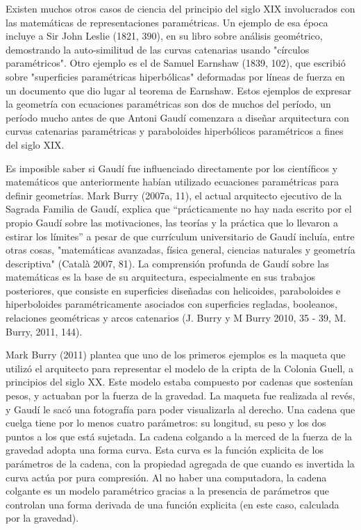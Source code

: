 Existen muchos otros casos de ciencia del principio del siglo XIX involucrados con las matemáticas de representaciones paramétricas. Un ejemplo de esa época incluye a Sir John Leslie (1821, 390), en su libro sobre análisis geométrico, demostrando la auto-similitud de las curvas catenarias usando "círculos paramétricos". Otro ejemplo es el de Samuel Earnshaw (1839, 102), que escribió sobre "superficies paramétricas hiperbólicas" deformadas por líneas de fuerza en un documento que dio lugar al teorema de Earnshaw. Estos ejemplos de expresar la geometría con ecuaciones paramétricas son dos de muchos del período, un período mucho antes de que Antoni Gaudí comenzara a diseñar arquitectura con curvas catenarias paramétricas y paraboloides hiperbólicos paramétricos a fines del siglo XIX.

Es imposible saber si Gaudí fue influenciado directamente por los científicos y matemáticos que anteriormente habían utilizado ecuaciones paramétricas para definir geometrías. Mark Burry (2007a, 11), el actual arquitecto ejecutivo de la Sagrada Familia de Gaudí, explica que ``prácticamente no hay nada escrito por el propio Gaudí sobre las motivaciones, las teorías y la práctica que lo llevaron a estirar los límites'' a pesar de que currículum universitario de Gaudí incluía, entre otras cosas, "matemáticas avanzadas, física general, ciencias naturales y geometría descriptiva" (Català 2007, 81). La comprensión profunda de Gaudí sobre las matemáticas es la base de su arquitectura, especialmente en sus trabajos posteriores, que consiste en superficies diseñadas con helicoides, paraboloides e hiperboloides paramétricamente asociados con superficies regladas, booleanos, relaciones geométricas y arcos catenarios (J. Burry y M Burry 2010, 35 - 39, M. Burry, 2011, 144). \cite{Davis2013}

Mark Burry (2011) plantea que uno de los primeros ejemplos es la maqueta que utilizó el arquitecto para representar el modelo de la cripta de la Colonia Guell, a principios del siglo XX. Este modelo estaba compuesto por cadenas que sostenían pesos, y actuaban por la fuerza de la gravedad.
La maqueta fue realizada al revés, y Gaudí le sacó una fotografía para poder visualizarla al derecho. Una cadena que cuelga tiene por lo menos cuatro parámetros: su longitud, su peso y los dos puntos a los que está sujetada. La cadena colgando a la merced de la fuerza de la gravedad adopta una forma curva. Esta curva es la función explicita de los parámetros de la cadena, con la propiedad agregada de que cuando es invertida la curva actúa por pura compresión. Al no haber una computadora, la cadena colgante es un modelo paramétrico gracias a la presencia de parámetros que controlan una forma derivada de una función explicita (en este caso, calculada por la gravedad).



